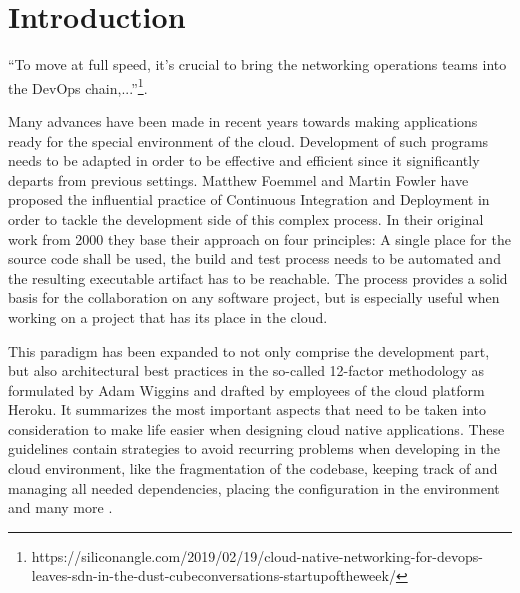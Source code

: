 	\section{Introduction}
%

``To move at full speed, it’s crucial to bring the networking operations teams into the DevOps chain,...''\footnote{https://siliconangle.com/2019/02/19/cloud-native-networking-for-devops-leaves-sdn-in-the-dust-cubeconversations-startupoftheweek/}.

Many advances have been made in recent years towards making applications ready for the special environment of the cloud. Development of such programs needs to be adapted in order to be effective and efficient since it significantly departs from previous settings. Matthew Foemmel and Martin Fowler have proposed the influential practice of Continuous Integration and Deployment \cite{fowler_2006} \cite{fowler_foemmel_2000} in order to tackle the development side of this complex process. In their original work from 2000 they base their approach  on four principles: A single place for the source code shall be used, the build and test process needs to be automated and the resulting executable artifact has to be reachable.
The process provides a solid basis for the collaboration on any software project, but is especially useful when working on a project that has its place in the cloud. 

This paradigm has been expanded to not only comprise the development part, but also architectural best practices in the so-called 12-factor methodology as formulated by Adam Wiggins and drafted by employees of the cloud platform Heroku.  It summarizes the most important aspects that need to be taken into consideration to make life easier when designing cloud native applications. These guidelines contain strategies to avoid recurring problems when developing in the cloud environment, like the fragmentation of the codebase, keeping track of and managing all needed dependencies, placing the configuration in the environment and many more \cite{hofmann2017microservices} \cite{12Factor}. 

